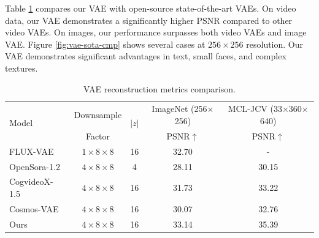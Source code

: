 Table \ref{tab:sota_vae} compares our VAE with open-source state-of-the-art VAEs. On video data, our VAE demonstrates a significantly higher PSNR compared to other video VAEs. On images, our performance surpasses both video VAEs and image VAE. Figure \ref{fig:vae-sota-cmp} shows several cases at $256 \times 256$ resolution. Our VAE demonstrates significant advantages in text, small faces, and complex textures.


\begin{table}[ht]
\renewcommand{\arraystretch}{1.2}
\small
\centering  
\caption{VAE reconstruction metrics comparison.}
\begin{tabular}{lcccc}
\toprule
\multirow{2}{*}{Model} & Downsample  & \multirow{2}{*}{$|z|$} & ImageNet (256$\times$256)
& MCL-JCV (33$\times$360$\times$640) \\
& Factor & & PSNR$\uparrow$ & PSNR$\uparrow$ \\
\midrule
FLUX-VAE~\cite{FLUX}                   & $1 \times 8 \times 8$ & 16 & 32.70 & - \\
\midrule
OpenSora-1.2~\cite{opensora}           & $4 \times 8 \times 8$ & 4  & 28.11 & 30.15 \\
CogvideoX-1.5~\cite{yang2024cogvideox} & $4 \times 8 \times 8$ & 16 & 31.73 & 33.22 \\
Cosmos-VAE~\cite{cosmos}               & $4 \times 8 \times 8$ & 16 & 30.07 & 32.76 \\
Ours                                   & $4 \times 8 \times 8$ & 16 & 33.14 & 35.39 \\
\bottomrule
\end{tabular}
\label{tab:sota_vae}
\end{table}

